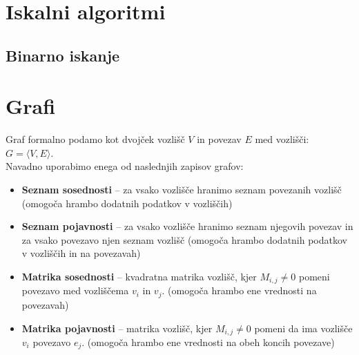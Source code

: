 \documentclass[10pt,a4paper,oneside]{book}
\newenvironment{items}{
\begin{itemize}
  \setlength{\itemsep}{1pt}
  \setlength{\parskip}{0pt}
  \setlength{\parsep}{0pt}
}{\end{itemize}}
\begin{document}
\chapter{Iskalni algoritmi}
\section{Binarno iskanje}

\chapter{Grafi}
Graf formalno podamo kot dvojček vozlišč $V$ in povezav $E$ med vozlišči: $G=\langle V, E \rangle$.\\
Navadno uporabimo enega od naslednjih zapisov grafov:
\begin{items}
\item \textbf{Seznam sosednosti} -- za vsako vozlišče hranimo seznam povezanih vozlišč (omogoča hrambo dodatnih podatkov v vozliščih)
\item \textbf{Seznam pojavnosti} -- za vsako vozlišče hranimo seznam njegovih povezav in za vsako povezavo njen seznam vozlišč (omogoča hrambo dodatnih podatkov v vozliščih in na povezavah)
\item \textbf{Matrika sosednosti} -- kvadratna matrika vozlišč, kjer $M_{i,j} \neq 0$ pomeni povezavo med vozliščema $v_i$ in $v_j$. (omogoča hrambo ene vrednosti na povezavah)
\item \textbf{Matrika pojavnosti} -- matrika vozlišč, kjer $M_{i,j} \neq 0$ pomeni da ima vozlišče $v_i$ povezavo $e_j$. (omogoča hrambo ene vrednosti na obeh koncih povezave)
\end{items}
\end{document}
